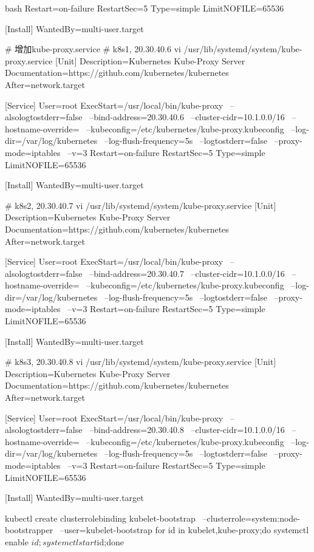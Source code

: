 \begin{outline}[enumerate]
\begin{code-in-enumerate}{bash}
Restart=on-failure
RestartSec=5
Type=simple
LimitNOFILE=65536

[Install]
WantedBy=multi-user.target

# 增加kube-proxy.service
# k8s1, 20.30.40.6
vi /usr/lib/systemd/system/kube-proxy.service
[Unit]
Description=Kubernetes Kube-Proxy Server
Documentation=https://github.com/kubernetes/kubernetes
After=network.target

[Service]
User=root
ExecStart=/usr/local/bin/kube-proxy \
    --alsologtostderr=false \
    --bind-address=20.30.40.6 \
    --cluster-cidr=10.1.0.0/16 \
    --hostname-override= \
    --kubeconfig=/etc/kubernetes/kube-proxy.kubeconfig \
    --log-dir=/var/log/kubernetes \
    --log-flush-frequency=5s \
    --logtostderr=false \
    --proxy-mode=iptables \
    --v=3
Restart=on-failure
RestartSec=5
Type=simple
LimitNOFILE=65536

[Install]
WantedBy=multi-user.target

# k8s2, 20.30.40.7
vi /usr/lib/systemd/system/kube-proxy.service
[Unit]
Description=Kubernetes Kube-Proxy Server
Documentation=https://github.com/kubernetes/kubernetes
After=network.target

[Service]
User=root
ExecStart=/usr/local/bin/kube-proxy \
    --alsologtostderr=false \
    --bind-address=20.30.40.7 \
    --cluster-cidr=10.1.0.0/16 \
    --hostname-override= \
    --kubeconfig=/etc/kubernetes/kube-proxy.kubeconfig \
    --log-dir=/var/log/kubernetes \
    --log-flush-frequency=5s \
    --logtostderr=false \
    --proxy-mode=iptables \
    --v=3
Restart=on-failure
RestartSec=5
Type=simple
LimitNOFILE=65536

[Install]
WantedBy=multi-user.target

# k8s3, 20.30.40.8
vi /usr/lib/systemd/system/kube-proxy.service
[Unit]
Description=Kubernetes Kube-Proxy Server
Documentation=https://github.com/kubernetes/kubernetes
After=network.target

[Service]
User=root
ExecStart=/usr/local/bin/kube-proxy \
    --alsologtostderr=false \
    --bind-address=20.30.40.8 \
    --cluster-cidr=10.1.0.0/16 \
    --hostname-override= \
    --kubeconfig=/etc/kubernetes/kube-proxy.kubeconfig \
    --log-dir=/var/log/kubernetes \
    --log-flush-frequency=5s \
    --logtostderr=false \
    --proxy-mode=iptables \
    --v=3
Restart=on-failure
RestartSec=5
Type=simple
LimitNOFILE=65536

[Install]
WantedBy=multi-user.target


kubectl create clusterrolebinding kubelet-bootstrap \
            --clusterrole=system:node-bootstrapper \
            --user=kubelet-bootstrap
for id in {kubelet,kube-proxy};do systemctl enable $id;systemctl start $id;done


\end{code-in-enumerate}
\end{outline}

